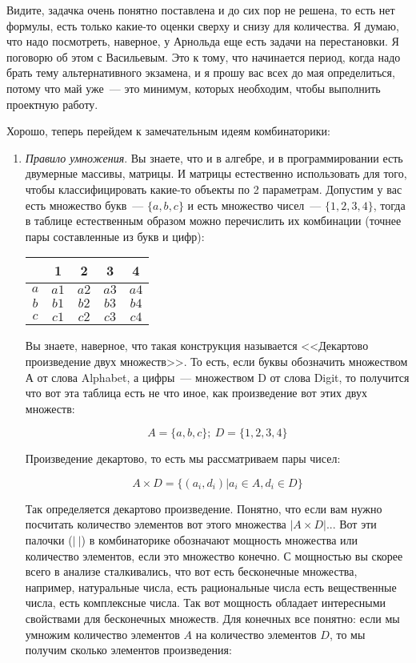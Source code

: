 \documentclass[russian]{lecture-notes}
\theoremstyle{definition}
\begin{document}
	Видите, задачка очень понятно поставлена и до сих пор не решена, то есть нет формулы, есть только какие-то оценки сверху и снизу для количества. Я думаю, что надо посмотреть, наверное, у Арнольда еще есть задачи на перестановки. Я поговорю об этом с Васильевым. Это к тому, что начинается период, когда надо брать тему альтернативного экзамена, и я прошу вас всех до мая определиться, потому что май уже~--- это минимум, которых необходим, чтобы выполнить проектную работу.
	
	
	Хорошо, теперь перейдем к замечательным идеям комбинаторики:
	\begin{enumerate}
		\item \emph{Правило умножения}. Вы знаете, что и в алгебре, и в программировании есть двумерные массивы, матрицы. И матрицы естественно использовать для того, чтобы классифицировать какие-то объекты по 2 параметрам. Допустим у вас есть множество букв~--- $\{a, b, c\}$ и есть множество чисел~--- $\{1, 2, 3, 4\}$, тогда в таблице естественным образом можно перечислить их комбинации (точнее пары составленные из букв и цифр):
		
		\begin{table}[H]
			\centering
			\begin{tabular}{|c|c|c|c|c|}
				\cline{2-5}
				\multicolumn{1}{c|}{} & 1 & 2 & 3 & 4 \\ \hline
				$a$ & $a1$ & $a2$ & $a3$ & $a4$ \\ \hline
				$b$ & $b1$ & $b2$ & $b3$ & $b4$ \\ \hline
				$c$ & $c1$ & $c2$ & $c3$ & $c4$ \\ \hline
			\end{tabular}
		\end{table}
	
		Вы знаете, наверное, что такая конструкция называется <<Декартово произведение двух множеств>>. То есть, если буквы обозначить множеством А от слова Alphabet, а цифры~--- множеством D от слова Digit, то получится что вот эта таблица есть не что иное, как произведение вот этих двух множеств:
		
		\[
			A = \{a, b, c\}; \ D = \{1, 2, 3, 4\}
		\]
		
		\noindent Произведение декартово, то есть мы рассматриваем пары чисел:
		
		\[
			A \times D = \{(a_i, d_i) | a_i \in A, d_i \in D\}
		\]
		
		\noindent Так определяется декартово произведение. Понятно, что если вам нужно посчитать количество элементов вот этого множества $|A \times D|$... Вот эти палочки ($| \ |$) в комбинаторике обозначают мощность множества или количество элементов, если это множество конечно. С мощностью вы скорее всего в анализе сталкивались, что вот есть бесконечные множества, например, натуральные числа, есть рациональные числа есть вещественные числа, есть комплексные числа. Так вот мощность обладает интересными свойствами для бесконечных множеств. Для конечных все понятно: если мы умножим количество элементов $A$ на количество элементов $D$, то мы получим сколько элементов произведения:
		

\end{enumerate}
\end{document}

